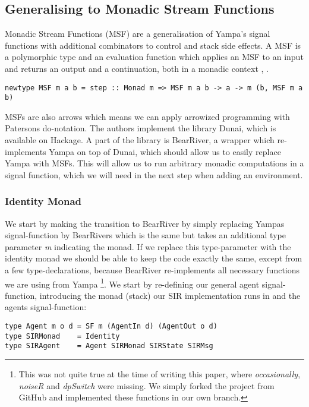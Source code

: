 \subsection{Generalising to Monadic Stream Functions}
Monadic Stream Functions (MSF) are a generalisation of Yampa's signal functions with additional combinators to control and stack side effects. A MSF is a polymorphic type and an evaluation function which applies an MSF to an input and returns an output and a continuation, both in a monadic context \cite{perez_functional_2016}, \cite{perez_extensible_2017}.
\begin{verbatim}
newtype MSF m a b = step :: Monad m => MSF m a b -> a -> m (b, MSF m a b)
\end{verbatim}

MSFs are also arrows which means we can apply arrowized programming with Patersons do-notation. The authors \cite{perez_functional_2016} implement the library Dunai, which is available on Hackage. A part of the library is BearRiver, a wrapper which re-implements Yampa on top of Dunai, which should allow us to easily replace Yampa with MSFs. This will allow us to run arbitrary monadic computations in a signal function, which we will need in the next step when adding an environment.

\subsubsection{Identity Monad}
We start by making the transition to BearRiver by simply replacing Yampas signal-function by BearRivers which is the same but takes an additional type parameter \textit{m} indicating the monad. If we replace this type-parameter with the identity monad we should be able to keep the code exactly the same, except from a few type-declarations, because BearRiver re-implements all necessary functions we are using from Yampa \footnote{This was not quite true at the time of writing this paper, where \textit{occasionally}, \textit{noiseR} and \textit{dpSwitch} were missing. We simply forked the project from GitHub and implemented these functions in our own branch.}.
We start by re-defining our general agent signal-function, introducing the monad (stack) our SIR implementation runs in and the agents signal-function:

\begin{verbatim}
type Agent m o d = SF m (AgentIn d) (AgentOut o d)
type SIRMonad    = Identity
type SIRAgent    = Agent SIRMonad SIRState SIRMsg
\end{verbatim}


